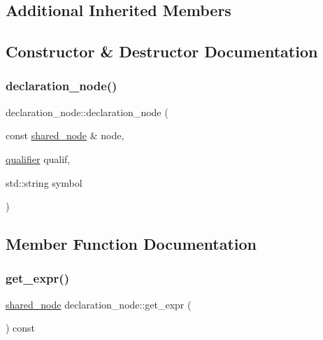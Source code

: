 \subsection*{Additional Inherited Members}


\subsection{Constructor \& Destructor Documentation}
\mbox{\label{classjawe_1_1declaration__node_af927c96ffda696812f1abd3be57e7160}} 
\subsubsection{\texorpdfstring{declaration\+\_\+node()}{declaration\_node()}}
{\footnotesize\ttfamily declaration\+\_\+node\+::declaration\+\_\+node (\begin{DoxyParamCaption}\item[{const \hyperlink{namespacejawe_a3f307481d921b6cbb50cc8511fc2b544}{shared\+\_\+node} \&}]{node,  }\item[{\hyperlink{namespacejawe_aeebd1dfc752b79ba7f0483883a839a1e}{qualifier}}]{qualif,  }\item[{std\+::string}]{symbol }\end{DoxyParamCaption})}



\subsection{Member Function Documentation}
\mbox{\label{classjawe_1_1declaration__node_a8563061c0c3048adabb08cfcc9e0c83b}} 
\subsubsection{\texorpdfstring{get\+\_\+expr()}{get\_expr()}}
{\footnotesize\ttfamily \hyperlink{namespacejawe_a3f307481d921b6cbb50cc8511fc2b544}{shared\+\_\+node} declaration\+\_\+node\+::get\+\_\+expr (\begin{DoxyParamCaption}{ }\end{DoxyParamCaption}) const}

